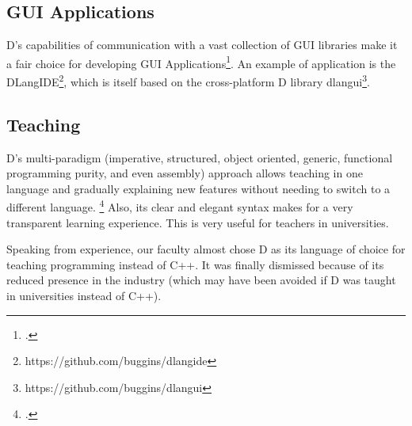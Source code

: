 \subsection{GUI Applications}

D's capabilities of communication with a vast collection of GUI libraries make it a fair choice for developing GUI Applications\footcite{gui_libraries}. An example of application is the DLangIDE\footnote{https://github.com/buggins/dlangide}, which is itself based on the cross-platform D library dlangui\footnote{https://github.com/buggins/dlangui}.

\subsection{Teaching}

D's multi-paradigm (imperative, structured, object oriented, generic, functional programming purity, and even assembly) approach allows teaching in one language and gradually explaining new features without needing to switch to a different language. \footcite{areas_of_d_usage} Also, its clear and elegant syntax makes for a very transparent learning experience. This is very useful for teachers in universities.

Speaking from experience, our faculty almost chose D as its language of choice for teaching programming instead of C++. It was finally dismissed because of its reduced presence in the industry (which may have been avoided if D was taught in universities instead of C++).
